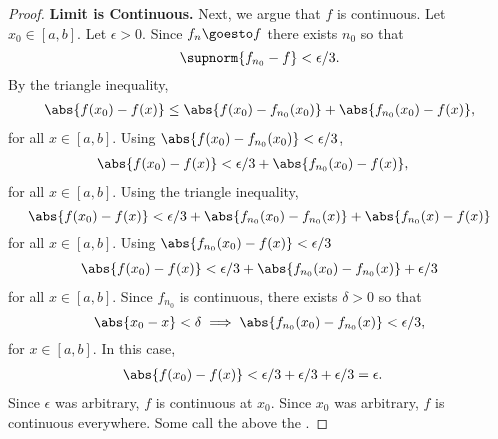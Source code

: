\begin{prop}
\begin{proof}
\textbf{Limit is Continuous.}
Next, we argue that $f$ is continuous.
Let $x_0 \in [a, b]$.
Let $\epsilon > 0$.
Since $f_n \goesto f$ there exists
$n_0$ so that
\[
  \supnorm{f_{n_0} - f} < \epsilon/3.
\]
By the triangle inequality,
\[
  \begin{aligned}
    \abs{f(x_0) - f(x)} \leq \abs{f(x_0) - f_{n_0}(x_0)} + \abs{f_{n_0}(x_0) - f(x)},
  \end{aligned}
\]
for all $x \in [a, b]$.
Using
$\abs{f(x_0) - f_{n_0}(x_0)} < \epsilon/3$,
\[
  \begin{aligned}
    \abs{f(x_0) - f(x)} &< \epsilon/3 + \abs{f_{n_0}(x_0) - f(x)},
  \end{aligned}
\]
for all $x \in [a, b]$.
Using the triangle inequality,
\[
   \abs{f(x_0) - f(x)} < \epsilon/3 + \abs{f_{n_0}(x_0) - f_{n_0}(x)} + \abs{f_{n_0}(x) - f(x)} \\
\]
for all $x \in [a, b]$.
Using
$\abs{f_{n_0}(x_0) - f(x)} < \epsilon/3$
\[
  \begin{aligned}
   \abs{f(x_0) - f(x)} < \epsilon/3 + \abs{f_{n_0}(x_0) - f_{n_0}(x)} + \epsilon/3 \\
  \end{aligned}
\]
for all $x \in [a, b]$.
Since $f_{n_0}$ is
continuous, there exists
$\delta > 0$ so that
\[
  \abs{x_0 - x} < \delta
  \implies
  \abs{f_{n_0}(x_0) - f_{n_0}(x)} < \epsilon/3,
\]
for $x \in [a, b]$.
In this case,
\[
  \begin{aligned}
    \abs{f(x_0) - f(x)} &< \epsilon/3 + \epsilon/3 + \epsilon/3 = \epsilon.
  \end{aligned}
\]
Since $\epsilon$ was arbitrary, $f$
is continuous at $x_0$.
Since $x_0$ was arbitrary,
$f$ is continuous everywhere.
Some call the above the
.
\end{proof}

\end{prop}
\strats
